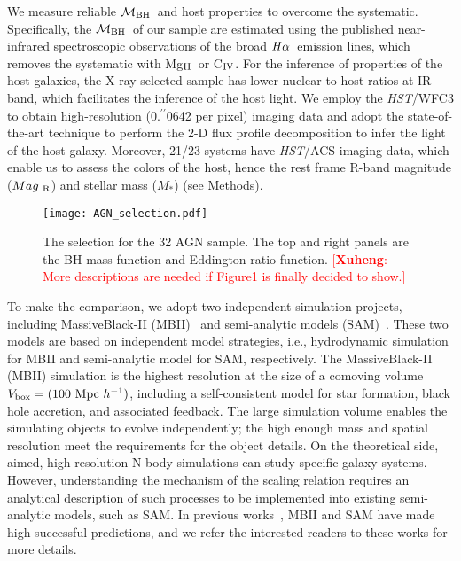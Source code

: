 \documentclass{natureprintstyle}
\newcommand{\hst}{{\it HST}}
\newcommand{\mbh}{$\mathcal M_{\rm BH}$}
\newcommand{\mr}{$Mag_{\rm ~R}$}
\newcommand{\halpha}{${\it H}\alpha$}
\newcommand{\mstar}{{$M_*$}}
\newcommand{\Mgii}{Mg$_{\rm II}$}
\newcommand{\Civ}{C$_{\rm IV}$}
\newcommand{\farcs}{\mbox{\ensuremath{.\!\!^{\prime\prime}}}}%
\newcommand{\ding}[1]{\textcolor{red}{[{\bf Xuheng}: #1]}}
\begin{document}
We measure reliable \mbh\ and host properties to overcome the systematic. Specifically, the \mbh\ of our sample are estimated using the published near-infrared spectroscopic observations of the broad \halpha\ emission lines, which removes the systematic with \Mgii\ or \Civ. For the inference of properties of the host galaxies, the X-ray selected sample has lower nuclear-to-host ratios at IR band, which facilitates the inference of the host light. We employ the \hst/WFC3 to obtain high-resolution (0\farcs0642 per pixel) imaging data and adopt the state-of-the-art technique to perform the 2-D flux profile decomposition to infer the light of the host galaxy. Moreover, 21/23 systems have \hst/ACS imaging data, which enable us to assess the colors of the host, hence the rest frame R-band magnitude (\mr) and stellar mass (\mstar) (see Methods). 

\begin{figure}[t]
\texttt{[image: AGN\_selection.pdf]}
\caption{The selection for the 32 AGN sample. The top and right panels are the BH mass function and Eddington ratio function. \ding{More descriptions are needed if Figure1 is finally decided to show.}
}
\label{fig:AGN_select}
\end{figure}

To make the comparison, we adopt two independent simulation projects, including MassiveBlack-II (MBII)~\cite{Khandai2015} and semi-analytic models (SAM)~\cite{Menci2014}. These two models are based on independent model strategies, i.e., hydrodynamic simulation for MBII and semi-analytic model for SAM, respectively. The MassiveBlack-II (MBII) simulation is the highest resolution at the size of a comoving volume $V_{\rm box} = (100~{\rm Mpc}~h^{-1})$, including a self-consistent model for star formation, black hole accretion, and associated feedback. The large simulation volume enables the simulating objects to evolve independently; the high enough mass and spatial resolution meet the requirements for the object details. On the theoretical side, aimed, high-resolution N-body simulations can study specific galaxy systems. However, understanding the mechanism of the scaling relation requires an analytical description of such processes to be implemented into existing semi-analytic models, such as SAM. In previous works~\cite{Huang2018, DeG++15, Khandai2015, Bhowmick2019, Menci2014, Menci2016}, MBII and SAM have made high successful predictions, and we refer the interested readers to these works for more details.
\end{document}
